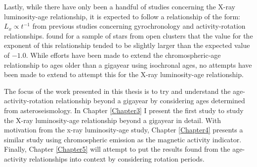 Lastly, while there have only been a handful of studies concerning the X-ray luminosity-age relationship, it is expected to follow a relationship of the form: $L_{x} \propto t^{-1}$ from previous studies concerning gyrochronology and activity-rotation relationships. \citet{Jackson_etal_2012} found for a sample of stars from open clusters that the value for the exponent of this relationship tended to be slightly larger than the expected value of $-1.0$. While efforts have been made to extend the chromospheric-age relationship to ages older than a gigayear using isochronal ages, no attempts have been made to extend to attempt this for the X-ray luminosity-age relationship.

The focus of the work presented in this thesis is to try and understand the age-activity-rotation relationship beyond a gigayear by considering ages determined from asteroseismology. In Chapter \ref{Chapter3} I present the first study to study the X-ray luminosity-age relationship beyond a gigayear in detail. With motivation from the x-ray luminosity-age study, Chapter \ref{Chapter4} presents a similar study using chromospheric emission as the magnetic activity indicator. Finally, Chapter \ref{Chapter5} will attempt to put the results found from the age-activity relationships into context by considering rotation periods.